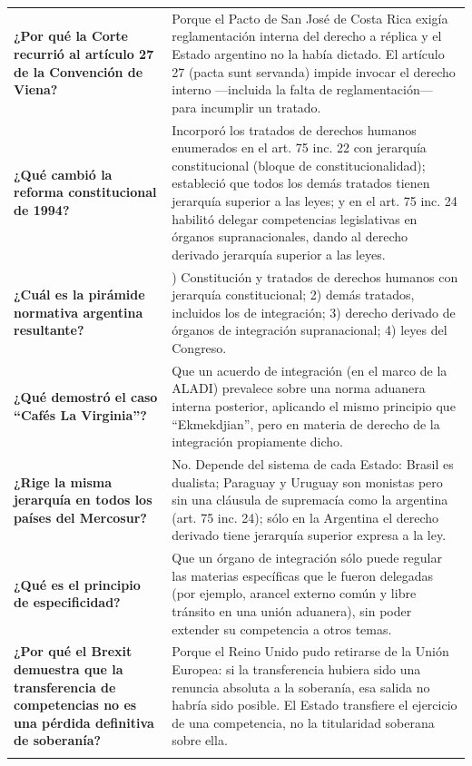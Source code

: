 \documentclass[12pt,oneside]{book}
\begin{document}
\begin{longtable}{@{}>{\raggedright\arraybackslash}p{}>{\raggedright\arraybackslash}p{}@{}}
\textbf{¿Por qué la Corte recurrió al artículo 27 de la Convención de Viena?} &
Porque el Pacto de San José de Costa Rica exigía reglamentación interna del derecho a réplica y el Estado argentino no la había dictado. El artículo 27 (pacta sunt servanda) impide invocar el derecho interno —incluida la falta de reglamentación— para incumplir un tratado. \\
\addlinespace

\textbf{¿Qué cambió la reforma constitucional de 1994?} &
Incorporó los tratados de derechos humanos enumerados en el art. 75 inc. 22 con jerarquía constitucional (bloque de constitucionalidad); estableció que todos los demás tratados tienen jerarquía superior a las leyes; y en el art. 75 inc. 24 habilitó delegar competencias legislativas en órganos supranacionales, dando al derecho derivado jerarquía superior a las leyes. \\
\addlinespace

\textbf{¿Cuál es la pirámide normativa argentina resultante?} &
1) Constitución y tratados de derechos humanos con jerarquía constitucional; 2) demás tratados, incluidos los de integración; 3) derecho derivado de órganos de integración supranacional; 4) leyes del Congreso. \\
\addlinespace

\textbf{¿Qué demostró el caso ``Cafés La Virginia''?} &
Que un acuerdo de integración (en el marco de la ALADI) prevalece sobre una norma aduanera interna posterior, aplicando el mismo principio que ``Ekmekdjian'', pero en materia de derecho de la integración propiamente dicho. \\
\addlinespace

\textbf{¿Rige la misma jerarquía en todos los países del Mercosur?} &
No. Depende del sistema de cada Estado: Brasil es dualista; Paraguay y Uruguay son monistas pero sin una cláusula de supremacía como la argentina (art. 75 inc. 24); sólo en la Argentina el derecho derivado tiene jerarquía superior expresa a la ley. \\
\addlinespace

\textbf{¿Qué es el principio de especificidad?} &
Que un órgano de integración sólo puede regular las materias específicas que le fueron delegadas (por ejemplo, arancel externo común y libre tránsito en una unión aduanera), sin poder extender su competencia a otros temas. \\
\addlinespace

\textbf{¿Por qué el Brexit demuestra que la transferencia de competencias no es una pérdida definitiva de soberanía?} &
Porque el Reino Unido pudo retirarse de la Unión Europea: si la transferencia hubiera sido una renuncia absoluta a la soberanía, esa salida no habría sido posible. El Estado transfiere el ejercicio de una competencia, no la titularidad soberana sobre ella. \\
\addlinespace


\end{longtable}
\end{document}

